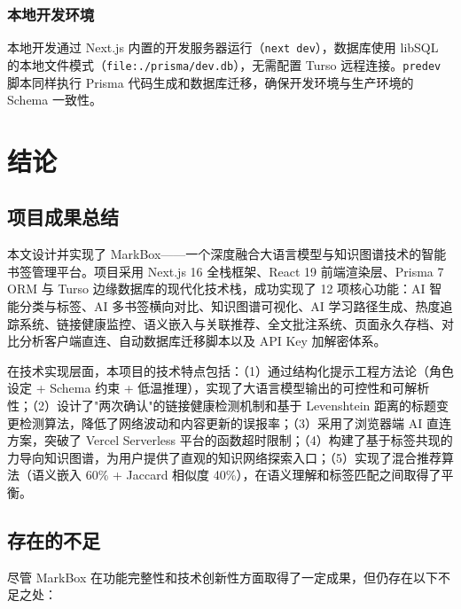 \documentclass[12pt,a4paper]{ctexart}
\begin{document}
\subsubsection{本地开发环境}

本地开发通过 Next.js 内置的开发服务器运行（\texttt{next dev}），数据库使用 libSQL 的本地文件模式（\texttt{file:./prisma/dev.db}），无需配置 Turso 远程连接。\texttt{predev} 脚本同样执行 Prisma 代码生成和数据库迁移，确保开发环境与生产环境的 Schema 一致性。

\section{结论}
\label{sec:conclusion}

\subsection{项目成果总结}

本文设计并实现了 MarkBox——一个深度融合大语言模型与知识图谱技术的智能书签管理平台。项目采用 Next.js 16 全栈框架、React 19 前端渲染层、Prisma 7 ORM 与 Turso 边缘数据库的现代化技术栈，成功实现了 12 项核心功能：AI 智能分类与标签、AI 多书签横向对比、知识图谱可视化、AI 学习路径生成、热度追踪系统、链接健康监控、语义嵌入与关联推荐、全文批注系统、页面永久存档、对比分析客户端直连、自动数据库迁移脚本以及 API Key 加解密体系。

在技术实现层面，本项目的技术特点包括：（1）通过结构化提示工程方法论（角色设定 + Schema 约束 + 低温推理），实现了大语言模型输出的可控性和可解析性；（2）设计了"两次确认"的链接健康检测机制和基于 Levenshtein 距离的标题变更检测算法，降低了网络波动和内容更新的误报率；（3）采用了浏览器端 AI 直连方案，突破了 Vercel Serverless 平台的函数超时限制；（4）构建了基于标签共现的力导向知识图谱，为用户提供了直观的知识网络探索入口；（5）实现了混合推荐算法（语义嵌入 60\% + Jaccard 相似度 40\%），在语义理解和标签匹配之间取得了平衡。

\subsection{存在的不足}

尽管 MarkBox 在功能完整性和技术创新性方面取得了一定成果，但仍存在以下不足之处：
\end{document}
